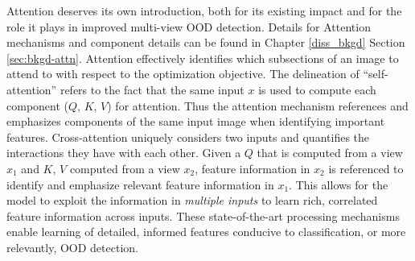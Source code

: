 Attention \cite{vaswani2017attention} deserves its own introduction, both for its existing impact and for the role it plays in improved multi-view OOD detection. Details for Attention mechanisms and component details can be found in Chapter \ref{diss_bkgd} Section \ref{sec:bkgd-attn}. Attention effectively identifies which subsections of an image to attend to with respect to the optimization objective. The delineation of ``self-attention'' refers to the fact that the same input $x$ is used to compute each component ($Q$, $K$, $V$) for attention. Thus the attention mechanism references and emphasizes components of the same input image when identifying important features. Cross-attention uniquely considers two inputs and quantifies the interactions they have with each other. Given a $Q$ that is computed from a view $x_1$ and $K$, $V$ computed from a view $x_2$, feature information in $x_2$ is referenced to identify and emphasize relevant feature information in $x_1$. This allows for the model to exploit the information in \emph{multiple inputs} to learn rich, correlated feature information across inputs. These state-of-the-art processing mechanisms enable learning of detailed, informed features conducive to classification, or more relevantly, OOD detection.

